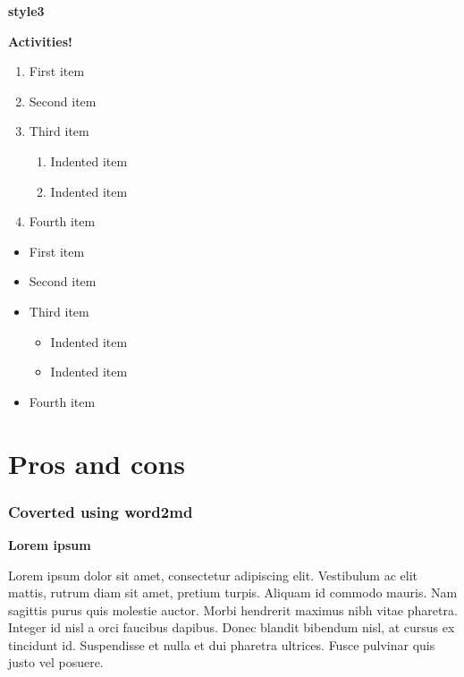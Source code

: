 \documentclass[
]{book}
\providecommand{\tightlist}{%
  \setlength{\itemsep}{0pt}\setlength{\parskip}{0pt}}
\begin{document}
\textbf{style3}

\textbf{Activities!}

\begin{enumerate}
\def\labelenumi{\arabic{enumi}.}
\tightlist
\item
  First item
\item
  Second item
\item
  Third item

  \begin{enumerate}
  \def\labelenumii{\arabic{enumii}.}
  \tightlist
  \item
    Indented item
  \item
    Indented item
  \end{enumerate}
\item
  Fourth item
\end{enumerate}

\begin{itemize}
\tightlist
\item
  First item
\item
  Second item
\item
  Third item

  \begin{itemize}
  \tightlist
  \item
    Indented item
  \item
    Indented item
  \end{itemize}
\item
  Fourth item
\end{itemize}

\hypertarget{pros-and-cons}{%
\chapter{Pros and cons}\label{pros-and-cons}}

\hypertarget{coverted-using-word2md}{%
\subsection{Coverted using word2md}\label{coverted-using-word2md}}

\textbf{Lorem ipsum}

Lorem ipsum dolor sit amet, consectetur adipiscing elit. Vestibulum ac elit mattis, rutrum diam sit amet, pretium turpis. Aliquam id commodo mauris. Nam sagittis purus quis molestie auctor. Morbi hendrerit maximus nibh vitae pharetra. Integer id nisl a orci faucibus dapibus. Donec blandit bibendum nisl, at cursus ex tincidunt id. Suspendisse et nulla et dui pharetra ultrices. Fusce pulvinar quis justo vel posuere.
\end{document}
